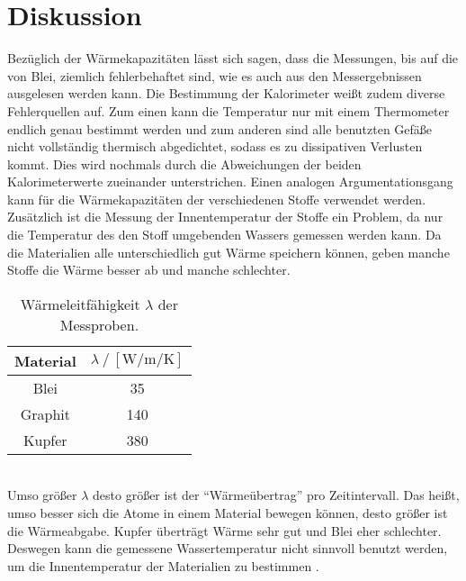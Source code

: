 \section{Diskussion}
\label{sec:Diskussion}
Bezüglich der Wärmekapazitäten lässt sich sagen, dass die Messungen, bis auf
die von Blei, ziemlich fehlerbehaftet sind, wie es auch aus den
Messergebnissen ausgelesen werden kann. Die Bestimmung der Kalorimeter weißt
zudem diverse Fehlerquellen auf. Zum einen kann die Temperatur nur mit einem
Thermometer endlich genau bestimmt werden und zum anderen sind alle benutzten
Gefäße nicht vollständig thermisch abgedichtet, sodass es zu dissipativen
Verlusten kommt. Dies wird nochmals durch die Abweichungen der beiden
Kalorimeterwerte zueinander unterstrichen.
Einen analogen Argumentationsgang kann für die Wärmekapazitäten der
verschiedenen Stoffe verwendet werden. Zusätzlich ist die Messung der Innentemperatur
der Stoffe ein Problem, da nur die Temperatur des den Stoff umgebenden Wassers
gemessen werden kann. Da die Materialien alle unterschiedlich gut Wärme
speichern können, geben manche Stoffe die Wärme besser ab und manche schlechter.
\begin{table}
  \centering
  \caption{Wärmeleitfähigkeit $\lambda$ der Messproben\cite{wärmeleitung}.}
  \label{tab:leitfähigkeit}
  \begin{tabular}{c S[table-format=3.0]}
    \toprule
    {Material} & {$λ \:/\: [\si{\watt\per\meter\per\kelvin}]$} \\
    \midrule
    Blei & 35 \\
    Graphit & 140 \\
    Kupfer & 380 \\
    \bottomrule
  \end{tabular}
\end{table}
\\
Umso größer $\lambda$ desto größer ist der \enquote{Wärmeübertrag} pro
Zeitintervall. Das heißt, umso besser sich die Atome in einem Material bewegen
können, desto größer ist die Wärmeabgabe. Kupfer überträgt Wärme sehr gut und
Blei eher schlechter. Deswegen kann die gemessene Wassertemperatur nicht
sinnvoll benutzt werden, um die Innentemperatur der Materialien zu bestimmen
\cite{wärmeleitung}.

